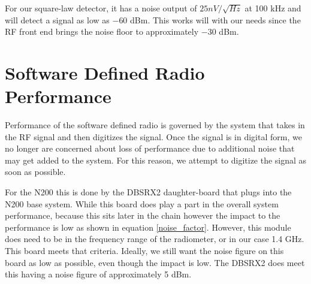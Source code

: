 For our square-law detector, it has a noise output of $25nV/ \sqrt{Hz}$ at 100 kHz and will detect a signal as low as $-60$ dBm.  This works will with our needs since the RF front end brings the noise floor to approximately $-30$ dBm.


\section{Software Defined Radio Performance}
Performance of the software defined radio is governed by the system that takes in the RF signal and then digitizes the signal.  Once the signal is in digital form, we no longer are concerned about loss of performance due to additional noise that may get added to the system.  For this reason, we attempt to digitize the signal as soon as possible.

For the N200 this is done by the DBSRX2 daughter-board that plugs into the N200 base system.  While this board does play a part in the overall system performance, because this sits later in the chain however the impact to the performance is low as shown in equation \ref{noise_factor}.  However, this module does need to be in the frequency range of the radiometer, or in our case 1.4 GHz.  This board meets that criteria.  Ideally, we still want the noise figure on this board as low as possible, even though the impact is low.  The DBSRX2 does meet this having a noise figure of approximately 5 dBm.
